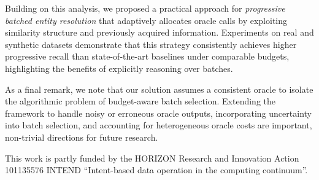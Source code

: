 \documentclass[sigconf, nonacm]{acmart}
\begin{document}
Building on this analysis, we proposed a practical approach for \emph{progressive batched entity resolution} that adaptively allocates oracle calls by exploiting similarity structure and previously acquired information.
Experiments on real and synthetic datasets demonstrate that this strategy consistently achieves higher progressive recall than state-of-the-art baselines under comparable budgets, highlighting the benefits of explicitly reasoning over batches.

As a final remark, we note that our solution assumes a consistent oracle to isolate the algorithmic problem of budget-aware batch selection.
Extending the framework to handle noisy or erroneous oracle outputs, incorporating uncertainty into batch selection, and accounting for heterogeneous oracle costs are important, non-trivial directions for future research.



\begin{acks}
This work is partly funded by the HORIZON Research and Innovation Action 101135576 INTEND ``Intent-based data operation in the computing continuum''.
\end{acks}




\end{document}
